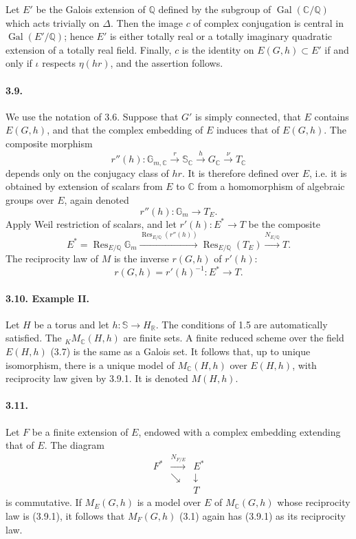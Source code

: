 \documentclass[10pt]{article}
\newcommand{\C}{\mathbb C}
\newcommand{\Gm}{\mathbb G_m}
\newcommand{\Q}{\mathbb Q}
\newcommand{\R}{\mathbb R}
\newcommand{\bS}{\mathbb S}
\newcommand{\Gal}{\operatorname{Gal}}
\newcommand{\MC}{M_{\C}}
\newcommand{\Res}{\operatorname{Res}}
\begin{document}
Let $E'$ be the Galois extension of $\Q$ defined by the subgroup of $\Gal(\C/\Q)$ which acts trivially on $\Delta$. Then the image $c$ of complex conjugation is central in $\Gal(E'/\Q)$; hence $E'$ is either totally real or a totally imaginary quadratic extension of a totally real field. Finally, $c$ is the identity on $E(G,h)\subset E'$ if and only if $\iota$ respects $\eta(hr)$, and the assertion follows.

\paragraph{3.9.} We use the notation of 3.6. Suppose that $G'$ is simply connected, that $E$ contains $E(G,h)$, and that the complex embedding of $E$ induces that of $E(G,h)$. The composite morphism
\[
r''(h):\mathbb G_{m,\C}\xrightarrow{r}\bS_\C\xrightarrow{h}G_\C\xrightarrow{\nu}T_\C
\]
depends only on the conjugacy class of $hr$. It is therefore defined over $E$, i.e. it is obtained by extension of scalars from $E$ to $\C$ from a homomorphism of algebraic groups over $E$, again denoted
\[
r''(h):\Gm\longrightarrow T_E.
\]
Apply Weil restriction of scalars, and let $r'(h):E^*\to T$ be the composite
\[
E^*=\Res_{E/\Q}\Gm\xrightarrow{\Res_{E/\Q}(r''(h))}\Res_{E/\Q}(T_E)\xrightarrow{N_{E/\Q}}T.
\]
The reciprocity law of $M$ is the inverse $r(G,h)$ of $r'(h)$:
\[
r(G,h)=r'(h)^{-1}:E^*\longrightarrow T .\tag{3.9.1}
\]

\paragraph{3.10. Example II.} Let $H$ be a torus and let $h:\bS\to H_\R$. The conditions of 1.5 are automatically satisfied. The ${}_K\MC(H,h)$ are finite sets. A finite reduced scheme over the field $E(H,h)$ (3.7) is the same as a Galois set. It follows that, up to unique isomorphism, there is a unique model of $\MC(H,h)$ over $E(H,h)$, with reciprocity law given by 3.9.1. It is denoted $M(H,h)$.

\paragraph{3.11.} Let $F$ be a finite extension of $E$, endowed with a complex embedding extending that of $E$. The diagram
\[
\begin{array}{ccc}
F^*&\xrightarrow{N_{F/E}}&E^*\\
&\searrow&\downarrow\\
&&T
\end{array}
\]
is commutative. If $M_E(G,h)$ is a model over $E$ of $\MC(G,h)$ whose reciprocity law is (3.9.1), it follows that $M_F(G,h)$ (3.1) again has (3.9.1) as its reciprocity law.
\end{document}
